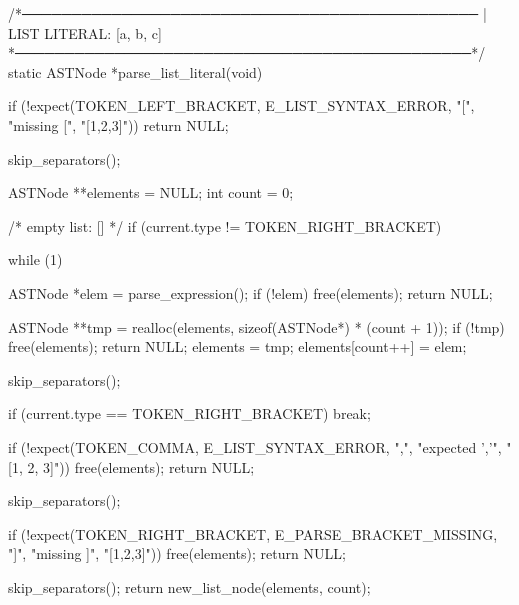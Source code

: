 \documentclass{article}
\begin{document}
/*──────────────────────────────────────────────
 | LIST LITERAL: [a, b, c]
 *──────────────────────────────────────────────*/
static ASTNode *parse_list_literal(void)
{
    if (!expect(TOKEN_LEFT_BRACKET, E_LIST_SYNTAX_ERROR, "[", "missing [", "[1,2,3]"))
        return NULL;

    skip_separators();

    ASTNode **elements = NULL;
    int count = 0;

    /* empty list: [] */
    if (current.type != TOKEN_RIGHT_BRACKET) {

        while (1) {

            ASTNode *elem = parse_expression();
            if (!elem) {
                free(elements);
                return NULL;
            }

            ASTNode **tmp = realloc(elements, sizeof(ASTNode*) * (count + 1));
            if (!tmp) {
                free(elements);
                return NULL;
            }
            elements = tmp;
            elements[count++] = elem;

            skip_separators();

            if (current.type == TOKEN_RIGHT_BRACKET)
                break;

            if (!expect(TOKEN_COMMA, E_LIST_SYNTAX_ERROR, ",", "expected ','", "[1, 2, 3]")) {
                free(elements);
                return NULL;
            }

            skip_separators();
        }
    }

    if (!expect(TOKEN_RIGHT_BRACKET, E_PARSE_BRACKET_MISSING, "]", "missing ]", "[1,2,3]")) {
        free(elements);
        return NULL;
    }

    skip_separators();
    return new_list_node(elements, count);
}
\end{document}
